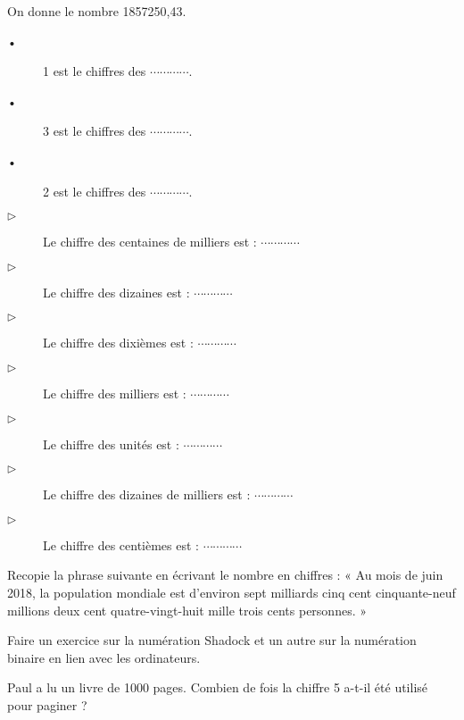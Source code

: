 
On donne le  nombre 1857250,43. 
\begin{description}
\item[•] 1 est le chiffres des $ \cdots\cdots\cdots\cdots $.
\item[•] 3 est le chiffres des $ \cdots\cdots\cdots\cdots $.
\item[•] 2 est le chiffres des $ \cdots\cdots\cdots\cdots $.

\item[$\triangleright$] Le chiffre des centaines de milliers est : $ \cdots\cdots\cdots\cdots $
\item[$\triangleright$] Le chiffre des dizaines est : $ \cdots\cdots\cdots\cdots $
\item[$\triangleright$] Le chiffre des dixièmes est : $ \cdots\cdots\cdots\cdots $
\item[$\triangleright$] Le chiffre des milliers est :  $ \cdots\cdots\cdots\cdots $
\item[$\triangleright$] Le chiffre des unités est : $ \cdots\cdots\cdots\cdots $
\item[$\triangleright$] Le chiffre des dizaines de milliers est : $ \cdots\cdots\cdots\cdots $
\item[$\triangleright$] Le chiffre des centièmes est : $ \cdots\cdots\cdots\cdots $

\end{description}




Recopie la phrase suivante en écrivant le nombre en chiffres :
« Au mois de juin 2018, la population mondiale est d'environ sept milliards cinq cent
cinquante-neuf millions deux cent quatre-vingt-huit mille trois cents personnes. »



Faire un exercice sur la numération Shadock et un autre sur la numération binaire en lien avec les ordinateurs.


 
 Paul a lu un livre de 1000 pages. Combien de fois la chiffre 5 a-t-il été utilisé pour paginer ?

